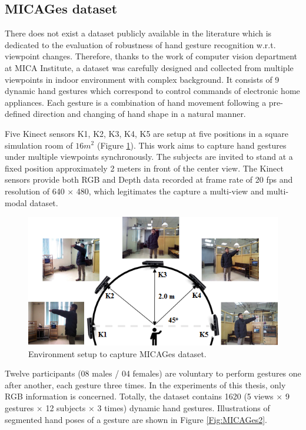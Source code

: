 
\subsection{MICAGes dataset}
    There does not exist a dataset publicly available in the literature which is dedicated to the evaluation of robustness of hand gesture recognition w.r.t. viewpoint changes.
    Therefore, thanks to the work of computer vision department at MICA Institute, a dataset was carefully designed and collected from multiple viewpoints in indoor environment with complex background.
    It consists of 9 dynamic hand gestures which correspond to control commands of electronic home appliances.
    Each gesture is a combination of hand movement following a pre-defined direction and changing of hand shape in a natural manner.

    Five Kinect sensors {K1, K2, K3, K4, K5} are setup at five positions in a square simulation room of $16m^2$ (Figure \ref{Fig:MICAGes1}).
    This work aims to capture hand gestures under multiple viewpoints synchronously. The subjects are invited to stand at a fixed position approximately 2 meters in front of the center view.
    The Kinect sensors provide both RGB and Depth data recorded at frame rate of 20 fps and resolution of 640 $\times$ 480, which legitimates the capture a multi-view and multi-modal dataset.

    \begin{figure}[h]
        \centering
        \includegraphics[width=0.8\linewidth]{figs/MICAGes1.png}
        \caption{Environment setup to capture MICAGes dataset.}
        \label{Fig:MICAGes1}
    \end{figure}

    Twelve participants (08 males / 04 females) are voluntary to perform gestures one after another, each gesture three times.
    In the experiments of this thesis, only RGB information is concerned.
    Totally, the dataset contains 1620 (5 views $\times$ 9 gestures $\times$ 12 subjects $\times$ 3 times) dynamic hand gestures.
    Illustrations of segmented hand poses of a gesture are shown in Figure \ref{Fig:MICAGes2}.


